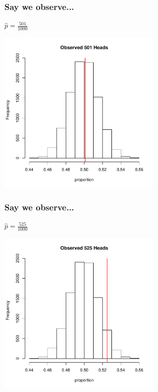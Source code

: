 \documentclass[slides]{beamer}
\begin{document}
\begin{frame}
\frametitle{Say we observe...}
$\widehat{p} = \frac{501}{1000}$
\begin{center}
\includegraphics[width=0.6\textwidth]{figure/hist2}
\end{center}
\end{frame}


\begin{frame}
\frametitle{Say we observe...}
$\widehat{p} = \frac{525}{1000}$
\begin{center}
\includegraphics[width=0.6\textwidth]{figure/hist3}
\end{center}
\end{frame}
\end{document}
